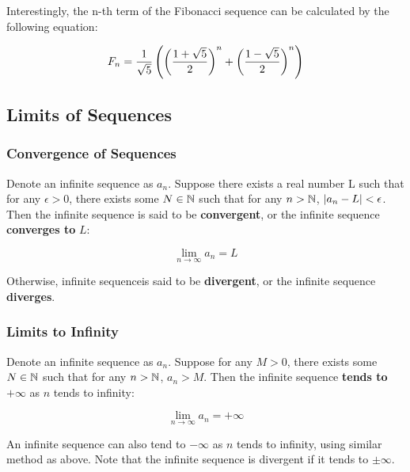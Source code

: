 \documentclass[a4paper,12pt]{article}
\begin{document}
Interestingly, the n-th term of the Fibonacci sequence can be calculated by the following equation:

$$F_{n}=\frac{1}{\sqrt{5}}\left( \left( \frac{1+\sqrt{5}}{2}\right)^{n}+\left( \frac{1-\sqrt{5}}{2}\right)^{n}\right)$$

\subsection{Limits of Sequences}
\subsubsection{Convergence of Sequences}
\begin{dft}
  Denote an infinite sequence as $a_{n}$. Suppose there exists a real number L such that for any $\epsilon>0$, there exists some $N\in\mathbb{N}$ such that for any $n>\mathbb{N}$, $\left| a_{n}-L\right|<\epsilon$. Then the infinite sequence is said to be \textbf{convergent}, or the infinite sequence \textbf{converges to} $L$:

  $$\lim_{n\to \infty}a_{n}=L$$\s

  Otherwise, infinite sequenceis said to be \textbf{divergent}, or the infinite sequence \textbf{diverges}.
\end{dft}

\subsubsection{Limits to Infinity}
\begin{dft}
  Denote an infinite sequence as $a_{n}$. Suppose for any $M>0$, there exists some $N\in\mathbb{N}$ such that for any $n>\mathbb{N}$, $a_{n}>M$. Then the infinite sequence \textbf{tends to} $+\infty$ as $n$ tends to infinity:

  $$\lim_{n\to \infty}a_{n}=+\infty$$
\end{dft}\n

An infinite sequence can also tend to $-\infty$ as $n$ tends to infinity, using similar method as above. Note that the infinite sequence is divergent if it tends to $\pm \infty$.
\end{document}
